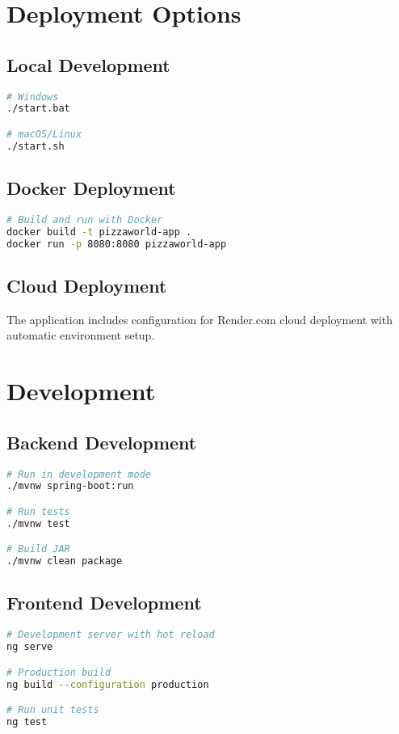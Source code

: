 \documentclass[11pt,a4paper]{article}
\begin{document}
\section{Deployment Options}

\subsection{Local Development}
\begin{lstlisting}[language=bash, caption=Local Development Commands]
# Windows
./start.bat

# macOS/Linux
./start.sh
\end{lstlisting}

\subsection{Docker Deployment}
\begin{lstlisting}[language=bash, caption=Docker Deployment]
# Build and run with Docker
docker build -t pizzaworld-app .
docker run -p 8080:8080 pizzaworld-app
\end{lstlisting}

\subsection{Cloud Deployment}
The application includes configuration for Render.com cloud deployment with automatic environment setup.

\section{Development}

\subsection{Backend Development}
\begin{lstlisting}[language=bash, caption=Backend Development Commands]
# Run in development mode
./mvnw spring-boot:run

# Run tests
./mvnw test

# Build JAR
./mvnw clean package
\end{lstlisting}

\subsection{Frontend Development}
\begin{lstlisting}[language=bash, caption=Frontend Development Commands]
# Development server with hot reload
ng serve

# Production build
ng build --configuration production

# Run unit tests
ng test
\end{lstlisting}
\end{document}
